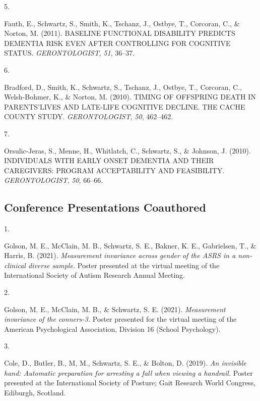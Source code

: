 \documentclass[11pt,a4paper,]{moderncv}
\newlength{\csllabelwidth}
\newcommand{\CSLLeftMargin}[1]{\parbox[t]{\csllabelwidth}{#1}}
\newcommand{\CSLRightInline}[1]{\parbox[t]{\linewidth - \csllabelwidth}{#1}}
\begin{document}
\leavevmode{}%
\CSLLeftMargin{5. }
\CSLRightInline{Fauth, E., Schwartz, S., Smith, K., Tschanz, J., Ostbye,
T., Corcoran, C., \& Norton, M. (2011). BASELINE FUNCTIONAL DISABILITY
PREDICTS DEMENTIA RISK EVEN AFTER CONTROLLING FOR COGNITIVE STATUS.
\emph{GERONTOLOGIST}, \emph{51}, 36--37.}

\leavevmode{}%
\CSLLeftMargin{6. }
\CSLRightInline{Bradford, D., Smith, K., Schwartz, S., Tschanz, J.,
Ostbye, T., Corcoran, C., Welsh-Bohmer, K., \& Norton, M. (2010). TIMING
OF OFFSPRING DEATH IN PARENTS'LIVES AND LATE-LIFE COGNITIVE DECLINE. THE
CACHE COUNTY STUDY. \emph{GERONTOLOGIST}, \emph{50}, 462--462.}

\leavevmode{}%
\CSLLeftMargin{7. }
\CSLRightInline{Orsulic-Jeras, S., Menne, H., Whitlatch, C., Schwartz,
S., \& Johnson, J. (2010). INDIVIDUALS WITH EARLY ONSET DEMENTIA AND
THEIR CAREGIVERS: PROGRAM ACCEPTABILITY AND FEASIBILITY.
\emph{GERONTOLOGIST}, \emph{50}, 66--66.}

\vspace{7mm}

\hypertarget{conference-presentations-coauthored}{%
\subsection{\texorpdfstring{\textbf{Conference Presentations
Coauthored}}{Conference Presentations Coauthored}}\label{conference-presentations-coauthored}}

\hypertarget{refs_confco}{}
\leavevmode{}%
\CSLLeftMargin{1. }
\CSLRightInline{Golson, M. E., McClain, M. B., Schwartz, S. E., Bakner,
K. E., Gabrielsen, T., \& Harris, B. (2021). \emph{Measurement
invariance across gender of the ASRS in a non-clinical diverse sample.}
Poster presented at the virtual meeting of the International Society of
Autism Research Annual Meeting.}

\leavevmode{}%
\CSLLeftMargin{2. }
\CSLRightInline{Golson, M. E., McClain, M. B., \& Schwartz, S. E.
(2021). \emph{Measurement invariance of the conners-3.} Poster presented
for the virtual meeting of the American Psychological Association,
Division 16 (School Psychology).}

\leavevmode{}%
\CSLLeftMargin{3. }
\CSLRightInline{Cole, D., Butler, B., M, M., Schwartz, S. E., \& Bolton,
D. (2019). \emph{An invisible hand: Automatic preparation for arresting
a fall when viewing a handrail.} Poster presented at the International
Society of Posture; Gait Research World Congress, Ediburgh, Scotland.}
\end{document}
